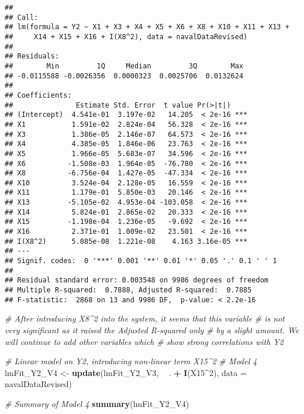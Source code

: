 \documentclass[
]{article}
\newenvironment{Shaded}{\begin{snugshade}}{\end{snugshade}}
\newcommand{\CommentTok}[1]{\textcolor[rgb]{0.56,0.35,0.01}{\textit{#1}}}
\newcommand{\DataTypeTok}[1]{\textcolor[rgb]{0.13,0.29,0.53}{#1}}
\newcommand{\DecValTok}[1]{\textcolor[rgb]{0.00,0.00,0.81}{#1}}
\newcommand{\KeywordTok}[1]{\textcolor[rgb]{0.13,0.29,0.53}{\textbf{#1}}}
\newcommand{\NormalTok}[1]{#1}
\newcommand{\OperatorTok}[1]{\textcolor[rgb]{0.81,0.36,0.00}{\textbf{#1}}}
\newcommand{\StringTok}[1]{\textcolor[rgb]{0.31,0.60,0.02}{#1}}
\begin{document}
\begin{verbatim}
## 
## Call:
## lm(formula = Y2 ~ X1 + X3 + X4 + X5 + X6 + X8 + X10 + X11 + X13 + 
##     X14 + X15 + X16 + I(X8^2), data = navalDataRevised)
## 
## Residuals:
##        Min         1Q     Median         3Q        Max 
## -0.0115588 -0.0026356  0.0000323  0.0025706  0.0132624 
## 
## Coefficients:
##               Estimate Std. Error  t value Pr(>|t|)    
## (Intercept)  4.541e-01  3.197e-02   14.205  < 2e-16 ***
## X1           1.591e-02  2.824e-04   56.328  < 2e-16 ***
## X3           1.386e-05  2.146e-07   64.573  < 2e-16 ***
## X4           4.385e-05  1.846e-06   23.763  < 2e-16 ***
## X5           1.966e-05  5.683e-07   34.596  < 2e-16 ***
## X6          -1.508e-03  1.964e-05  -76.780  < 2e-16 ***
## X8          -6.756e-04  1.427e-05  -47.334  < 2e-16 ***
## X10          3.524e-04  2.128e-05   16.559  < 2e-16 ***
## X11          1.179e-01  5.850e-03   20.146  < 2e-16 ***
## X13         -5.105e-02  4.953e-04 -103.058  < 2e-16 ***
## X14          5.824e-01  2.865e-02   20.333  < 2e-16 ***
## X15         -1.198e-04  1.236e-05   -9.692  < 2e-16 ***
## X16          2.371e-01  1.009e-02   23.501  < 2e-16 ***
## I(X8^2)      5.085e-08  1.221e-08    4.163 3.16e-05 ***
## ---
## Signif. codes:  0 '***' 0.001 '**' 0.01 '*' 0.05 '.' 0.1 ' ' 1
## 
## Residual standard error: 0.003548 on 9986 degrees of freedom
## Multiple R-squared:  0.7888, Adjusted R-squared:  0.7885 
## F-statistic:  2868 on 13 and 9986 DF,  p-value: < 2.2e-16
\end{verbatim}

\begin{Shaded}
\begin{Highlighting}[]
\CommentTok{# After introducing X8^2 into the system, it seems that this variable}
\CommentTok{# is not very significant as it raised the Adjusted R-squared only}
\CommentTok{# by a slight amount. We will continue to add other variables which}
\CommentTok{# show strong correlations with Y2}

\CommentTok{# Linear model on Y2, introducing non-linear term X15^2}
\CommentTok{# Model 4}
\NormalTok{lmFit_Y2_V4 <-}\StringTok{ }\KeywordTok{update}\NormalTok{(lmFit_Y2_V3, }\OperatorTok{~}\StringTok{ }\NormalTok{. }\OperatorTok{+}\StringTok{ }\KeywordTok{I}\NormalTok{(X15}\OperatorTok{^}\DecValTok{2}\NormalTok{), }\DataTypeTok{data =}\NormalTok{ navalDataRevised)}

\CommentTok{# Summary of Model 4}
\KeywordTok{summary}\NormalTok{(lmFit_Y2_V4)}
\end{Highlighting}
\end{Shaded}
\end{document}

